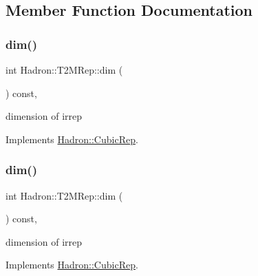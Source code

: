 \subsection{Member Function Documentation}
\mbox{\label{structHadron_1_1T2MRep_abb2e2a4877683fa8987cdd01d64a88a4}} 
\subsubsection{\texorpdfstring{dim()}{dim()}\hspace{0.1cm}{\footnotesize\ttfamily [1/3]}}
{\footnotesize\ttfamily int Hadron\+::\+T2\+M\+Rep\+::dim (\begin{DoxyParamCaption}{ }\end{DoxyParamCaption}) const\hspace{0.3cm}{\ttfamily [inline]}, {\ttfamily [virtual]}}

dimension of irrep 

Implements \mbox{\hyperlink{structHadron_1_1CubicRep_ac178d14064f037a66af4b9fb4b312d51}{Hadron\+::\+Cubic\+Rep}}.

\mbox{\label{structHadron_1_1T2MRep_abb2e2a4877683fa8987cdd01d64a88a4}} 
\subsubsection{\texorpdfstring{dim()}{dim()}\hspace{0.1cm}{\footnotesize\ttfamily [2/3]}}
{\footnotesize\ttfamily int Hadron\+::\+T2\+M\+Rep\+::dim (\begin{DoxyParamCaption}{ }\end{DoxyParamCaption}) const\hspace{0.3cm}{\ttfamily [inline]}, {\ttfamily [virtual]}}

dimension of irrep 

Implements \mbox{\hyperlink{structHadron_1_1CubicRep_ac178d14064f037a66af4b9fb4b312d51}{Hadron\+::\+Cubic\+Rep}}.

\mbox{\label{structHadron_1_1T2MRep_abb2e2a4877683fa8987cdd01d64a88a4}} 
